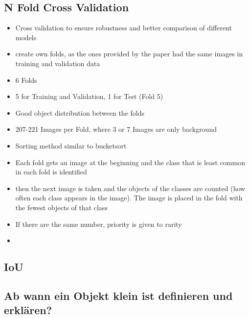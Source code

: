 \subsection{N Fold Cross Validation}
\begin{itemize}
    \item Cross validation to ensure robustness and better comparison of different models
    \item create own folds, as the ones provided by the paper had the same images in training and validation data
    \item  6 Folds
    \item 5 for Training and Validation, 1 for Test (Fold 5)
    \item Good object distribution between the folds
    \item 207-221 Images per Fold, where 3 or 7 Images are only background
    
    \item Sorting method similar to bucketsort
    \item Each fold gets an image at the beginning and the class that is least common in each fold is identified
    \item then the next image is taken and the objects of the classes are counted (how often each class appears in the image). The image is placed in the fold with the fewest objects of that class
    \item If there are the same number, priority is given to rarity
    \item {}


\end{itemize}

\subsection{IoU}

\subsection{Ab wann ein Objekt klein ist definieren und erklären?}



